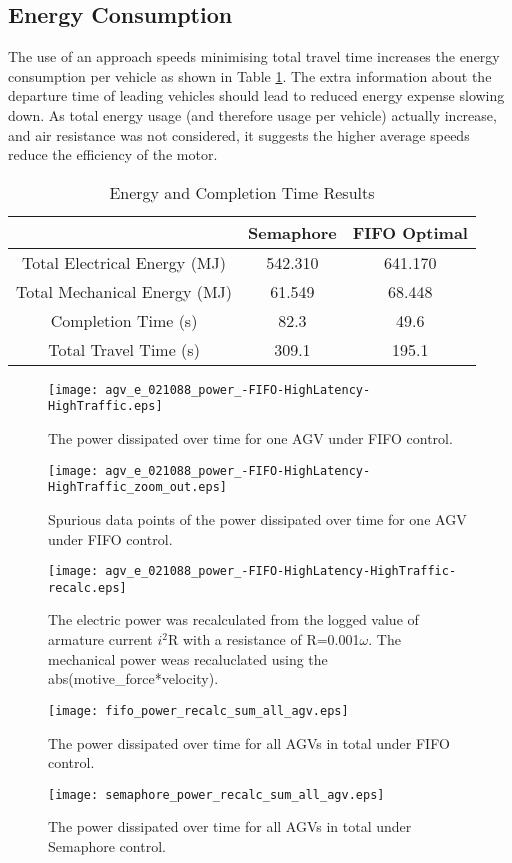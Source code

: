 \subsection{Energy Consumption}
The use of an approach speeds minimising total travel time increases the energy consumption per vehicle as shown in Table \ref{tab:energy_res}. The extra information about the departure time of leading vehicles should lead to reduced energy expense slowing down. As total energy usage (and therefore usage per vehicle) actually increase, and air resistance was not considered,  it suggests the higher average speeds reduce the efficiency of the motor.

\begin{table}
	\begin{tabular}{|c|c|c|}
		\hline
		& Semaphore & FIFO Optimal \\
		\hline
		Total Electrical Energy (MJ) & 542.310& 641.170\\
		Total Mechanical Energy (MJ) & 61.549& 68.448\\
		Completion Time (s) & 82.3 & 49.6\\
		Total Travel Time (s) & 309.1 & 195.1 \\
		\hline
	\end{tabular}
	\label{tab:energy_res}
	\caption{Energy and Completion Time Results }
\end{table}

\begin{figure}
	\texttt{[image: agv\_e\_021088\_power\_-FIFO-HighLatency-HighTraffic.eps]}
	\caption{The power dissipated over time for one AGV under FIFO control.}
	\label{fig:021088power}       %
\end{figure}
\begin{figure}
	\texttt{[image: agv\_e\_021088\_power\_-FIFO-HighLatency-HighTraffic\_zoom\_out.eps]}
	\caption{Spurious data points of the power dissipated over time for one AGV under FIFO control.}
	\label{fig:021088power_spurious}       %
\end{figure}

\begin{figure}
	\texttt{[image: agv\_e\_021088\_power\_-FIFO-HighLatency-HighTraffic-recalc.eps]}
	\caption{The electric power was recalculated from the logged value of armature current $i^2$R with a resistance of R=0.001$\omega$. The mechanical power weas recaluclated using the abs(motive\_force*velocity).}
	\label{fig:recalc_021088power}       %
\end{figure}

\begin{figure}
	\texttt{[image: fifo\_power\_recalc\_sum\_all\_agv.eps]}
	\caption{The power dissipated over time for all AGVs in total under FIFO control.}
	\label{fig:fifo_power_sum}       %
\end{figure}
\begin{figure}
	\texttt{[image: semaphore\_power\_recalc\_sum\_all\_agv.eps]}
	\caption{The power dissipated over time for all AGVs in total under Semaphore control.}
	\label{fig:semaphore_power_sum}       %
\end{figure}
